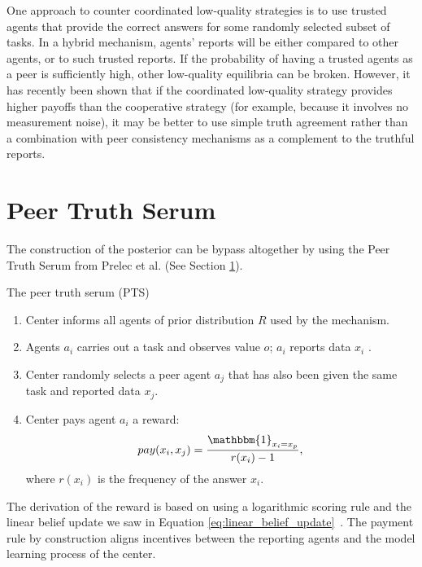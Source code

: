 \documentclass{report}
\theoremstyle{definition}
\begin{document}
One approach to counter coordinated low-quality strategies is to use trusted agents that provide the correct answers for some randomly selected subset of tasks. In a hybrid mechanism, agents’ reports will be either compared to other agents, or to such trusted reports. If the probability of having a trusted agents as a peer is sufficiently high, other low-quality equilibria can be broken. However, it has recently been shown that if the coordinated low-quality strategy provides higher payoffs than the cooperative strategy (for example, because it involves no measurement noise), it may be better to use simple truth agreement rather than a combination with peer consistency mechanisms as a complement to the truthful reports.~\cite{boi:book, gao:peer}






\section{Peer Truth Serum}
\label{sec:peer_truth_serum}
The construction of the posterior can be bypass altogether by using the Peer Truth Serum from Prelec et al. (See Section \ref{sec:peer_truth_serum}).

\begin{algorithm}[H]
    \caption{The peer truth serum (PTS)}
    \label{alg:peer_truth_serum}
    \begin{enumerate}
        \item Center informs all agents of prior distribution $R$ used by the mechanism.
        \item Agents $a_i$ carries out a task and observes value $o$; $a_i$ reports data $x_i$ .
        
        \item Center randomly selects a peer agent $a_j$ that has also been given the same task and reported data $x_j$.
        
        \item{Center pays agent $a_i$ a reward:
        \begin{equation*}
            pay(x_i, x_j)= \frac{\mathbbm{1}_{x_i = x_p}}{r(x_i) -1},
        \end{equation*}}
        where $r(x_i)$ is the frequency of the answer $x_i$. 
    \end{enumerate}
\end{algorithm}

The derivation of the reward is based on using a logarithmic scoring rule and the linear belief update we saw in Equation \ref{eq:linear_belief_update}~\cite[p42]{faltings:book}. The payment rule by construction aligns incentives between the reporting agents and the model learning process of the center.
\end{document}
